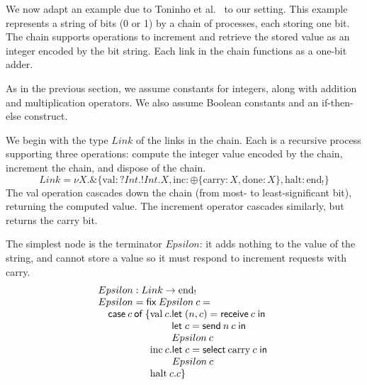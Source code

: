 \documentclass[orivec,envcountsame]{llncs}
\makeatletter
\newcommand{\with}{\mathbin\binampersand}
\newcommand{\parr}{\mathbin\bindnasrepma}
\newcommand{\cpdual}[1]{#1^\perp}
\newcommand{\gvout}[2]{{!#1.#2}}
\newcommand{\gvin}[2]{{?#1.#2}}
\newcommand{\outterm}{\mathrm{end}_!}
\newcommand{\mkwd}[1]{\mathsf{#1}}
\newcommand{\link}[2]{#1 \leftrightarrow #2}
\newcommand{\clabel}[1]{\mathrm{#1}}
\newcommand{\sel}[2]{#1[\clabel{#2}]}
\newcommand{\gvsend}[2]{\mkwd{send}\:#1\:#2}
\newcommand{\gvreceive}[1]{\mkwd{receive}\:#1}
\newcommand{\gvlet}[3]{\mkwd{let}\;#1 = #2\;\mkwd{in}\;#3}
\newcommand{\gvselect}[2]{\mkwd{select}\:#1\:#2}
\newcommand{\lrkwd}{\mkwd{fix}}
\newcommand{\ba}{\begin{array}}
\newcommand{\ea}{\end{array}}
\newcommand{\bl}{\ba[t]{@{}l@{}}}
\newcommand{\el}{\ea}
\makeatother
\begin{document}
We now adapt an example due to Toninho et al.~\cite{Toninho13} to our setting. This example
represents a string of bits (0 or 1) by a chain of processes, each storing one bit. The chain
supports operations to increment and retrieve the stored value as an integer encoded by the bit
string. Each link in the chain functions as a one-bit adder.

As in the previous section, we assume constants for integers, along with addition and multiplication
operators. We also assume Boolean constants and an if-then-else construct.

We begin with the type $Link$ of the links in the chain. Each is a recursive process supporting
three operations: compute the integer value encoded by the chain, increment the chain, and dispose
of the chain.
%
\[
 Link = \nu X. \with \{ \clabel{val}: \gvin{Int}{\gvout{Int}{X}}, \clabel{inc}: \oplus \{ \clabel{carry}: X, \clabel{done}: X \}, \clabel{halt}: \outterm \}
\]
The val operation cascades down the chain (from most- to least-significant bit), returning the
computed value.  The increment operator cascades similarly, but returns the carry bit.

The simplest node is the terminator $Epsilon$: it adds nothing to the value of the string, and
cannot store a value so it must respond to increment requests with carry.
%
%
\[
\bl
Epsilon : Link \to \outterm \\
Epsilon = \lrkwd\:Epsilon\:c = \\
\quad \mkwd{case}\:c\:\mkwd{of}\:\{
  \bl
  \clabel{val}\:c.
    \bl
    \gvlet{(n,c)}{\gvreceive{c}}{} \\
    \gvlet{c}{\gvsend{n}{c}}{} \\
    Epsilon\:c \\
    \el \\
  \clabel{inc}\:c.
    \bl
    \gvlet{c}{\gvselect{\clabel{carry}}{c}}{} \\
    Epsilon\:c \\
    \el \\
  \clabel{halt}\:c. c\}  \\
  \el \\
\el
\]
\end{document}
